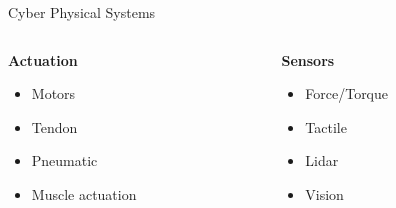\documentclass[11pt,t,usepdftitle=false,aspectratio=169]{beamer}
\begin{document}
\begin{frame}{Cyber Physical Systems}
   \begin{columns}
      \begin{column}{.455\textwidth}   
         \textbf{Actuation}
         \begin{itemize}
            \item Motors
            \item Tendon
            \item Pneumatic
            \item Muscle actuation
         \end{itemize}
      \end{column}
      \begin{column}{.455\textwidth}   
         \textbf{Sensors}
         \begin{itemize}
            \item Force/Torque
            \item Tactile
            \item Lidar
            \item Vision
         \end{itemize}
      \end{column}
   \end{columns}
   
   \bigbreak


\end{frame}
\end{document}
